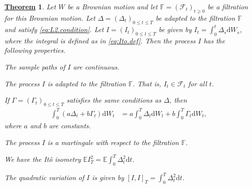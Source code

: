 \documentclass[12pt]{book}
\numberwithin{equation}{chapter}
\theoremstyle{plain}
\newtheorem{theorem}{\underline{Theorem}}
\numberwithin{theorem}{section}
\theoremstyle{definition}
\numberwithin{exercise}{chapter}
\newcommand{\<}{\langle}
\renewcommand{\>}{\rangle}
\renewcommand{\(}{\left(}
\renewcommand{\)}{\right)}
\renewcommand{\[}{\left[}
\renewcommand{\]}{\right]}
\newcommand\Eb{\mathds{E}}
\newcommand\Fb{\mathds{F}}
\newcommand\Fc{\mathscr{F}}
\newcommand\Gam{\Gamma}
\newcommand\Del{\Delta}
\newcommand\dd{\mathrm{d}}
\begin{document}
\begin{theorem}
\label{thm:ito.props}
Let $W$ be a Brownian motion and let $\Fb=(\Fc_t)_{t \geq 0}$ be a filtration for this Brownian motion.
Let $\Del = (\Del_t)_{0 \leq t \leq T}$ be adapted to the filtration $\Fb$ and satisfy \eqref{eq:L2.condition}.  
Let $I = (I_t)_{0 \leq t \leq T}$  be given by $I_t = \int_0^t \Del_s \dd W_s$, where the integral is defined as in \eqref{eq:Ito.def}.  Then the process $I$ has the following properties.
\begin{enumerate*}
\item The sample paths of $I$ are continuous.
\item The process $I$ is adapted to the filtration $\Fb$.  That is, $I_t \in \Fc_t$ for all $t$.
\item If $\Gam = (\Gam_t)_{0 \leq t \leq T}$ satisfies the same conditions as $\Del$, then
\begin{align}
\int_0^T \( a \Del_t + b \Gam_t \) \dd W_t
	&=	a \int_0^T \Del_t \dd W_t + b \int_0^T \Gam_t \dd W_t ,
\end{align}
where $a$ and $b$ are constants.
\item The process $I$ is a martingale with respect to the filtration $\Fb$.  
\item We have the It\^o isometry $\Eb I_T^2 = \Eb \int_0^T \Del_t^2 \dd t$.
\item The quadratic variation of $I$ is given by $[I,I]_T = \int_0^T \Del_t^2 \dd t$.
\end{enumerate*}
\end{theorem}

\end{document}
